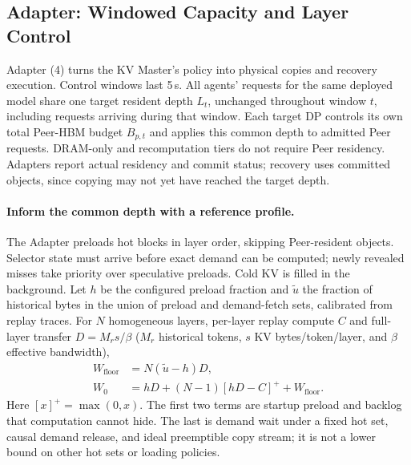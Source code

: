 \subsection{Adapter: Windowed Capacity and Layer Control}
\label{sec:kv-runtime}
\label{sec:capacity-allocation}

Adapter (4) turns the KV Master's policy into physical copies and
recovery execution. Control windows last 5\,s. All agents' requests for
the same deployed model share one target resident depth $L_t$, unchanged
throughout window $t$, including requests arriving during that window.
Each target DP controls its own total Peer-HBM budget $B_{p,t}$ and
applies this common depth to admitted Peer requests. DRAM-only and
recomputation tiers do not require Peer residency. Adapters report actual
residency and commit status; recovery uses committed objects, since
copying may not yet have reached the target depth.



\paragraph{Inform the common depth with a reference profile.}
The Adapter preloads hot blocks in layer order, skipping Peer-resident
objects. Selector state must arrive before exact demand can be computed;
newly revealed misses take priority over speculative preloads. Cold KV
is filled in the background. Let $h$ be the configured preload fraction and
$\widetilde u$ the fraction of historical bytes in the union of preload
and demand-fetch sets, calibrated from replay traces. For $N$ homogeneous
layers, per-layer replay compute $C$ and full-layer transfer
$D=M_rs/\beta$ ($M_r$ historical tokens, $s$ KV bytes/token/layer, and
$\beta$ effective bandwidth),
\begin{align}
 W_{\mathrm{floor}}&=N(\widetilde u-h)D,\label{eq:demand-floor}\\
 W_0&=hD+(N-1)[hD-C]^++W_{\mathrm{floor}}.\label{eq:exposed-wait}
\end{align}
Here $[x]^+=\max(0,x)$. The first two terms are startup preload and
backlog that computation cannot hide. The last is demand wait under a
fixed hot set, causal demand release, and ideal preemptible copy stream;
it is not a lower bound on other hot sets or loading policies.

